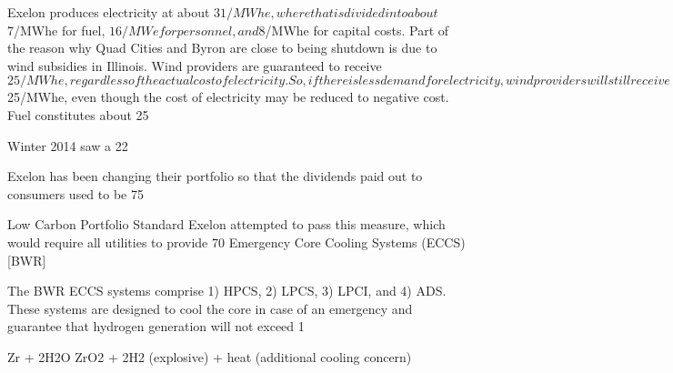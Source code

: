 \documentclass[10pt]{article}
\begin{document}
Exelon produces electricity at about $31/MWhe, where that is divided into about $7/MWhe for fuel, $16/MWe for personnel, and $8/MWhe for capital costs. Part of the reason why Quad Cities and Byron are close to being shutdown is due to wind subsidies in Illinois. Wind providers are guaranteed to receive $25/MWhe, regardless of the actual cost of electricity. So, if there is less demand for electricity, wind providers will still receive $25/MWhe, even though the cost of electricity may be reduced to negative cost. Fuel constitutes about 25%

Winter 2014 saw a 22%

Exelon has been changing their portfolio so that the dividends paid out to consumers used to be 75%

Low Carbon Portfolio Standard
Exelon attempted to pass this measure, which would require all utilities to provide 70%
Emergency Core Cooling Systems (ECCS) [BWR]

The BWR ECCS systems comprise 1) HPCS, 2) LPCS, 3) LPCI, and 4) ADS. These systems are designed to cool the core in case of an emergency and guarantee that hydrogen generation will not exceed 1%

Zr + 2H2O  ZrO2 + 2H2 (explosive) + heat (additional cooling concern)
\end{document}
